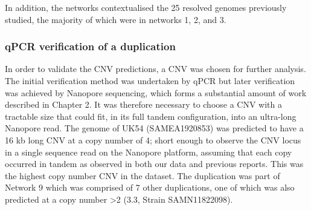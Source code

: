 \documentclass{article}
\begin{document}
In addition, the networks contextualised the 25 resolved genomes previously studied, the majority of which were in networks 1, 2, and 3.


\begin{table}[]

\caption{Table of network statistics}
\label{tab:Network_table}
\end{table}



\subsubsection{qPCR verification of a duplication}
In order to validate the CNV predictions, a CNV was chosen for further analysis. The initial verification method was undertaken by qPCR  but later verification was achieved by Nanopore sequencing, which forms a substantial amount of work described in Chapter 2. It was therefore necessary to choose a CNV with a tractable size  that could fit, in its full tandem configuration, into an ultra-long Nanopore read. The genome of UK54 (SAMEA1920853) was predicted to have a 16 kb long CNV at a copy number of 4; short enough to observe the CNV locus in a single sequence read on the Nanopore platform, assuming that each copy occurred in tandem as observed in both our data and previous reports. This was the highest copy number CNV in the dataset. The duplication was part of Network 9 which was comprised of 7 other duplications, one of which was also predicted at a copy number >2  (3.3, Strain SAMN11822098).
\end{document}
